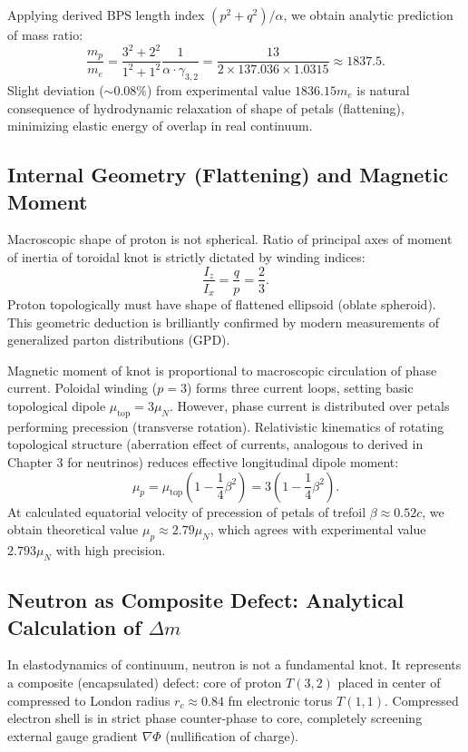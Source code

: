 \documentclass[12pt,a4paper]{article}
\begin{document}
Applying derived BPS length index $(p^2+q^2)/\alpha$, we obtain analytic prediction of mass ratio:
\begin{equation}
    \frac{m_p}{m_e} = \frac{3^2+2^2}{1^2+1^2} \frac{1}{\alpha \cdot \gamma_{3,2}} = \frac{13}{2 \times 137.036 \times 1.0315} \approx 1837.5.
    \label{eq:proton_mass_prediction_2}
\end{equation}
Slight deviation ($\sim 0.08\%$) from experimental value $1836.15 m_e$ is natural consequence of hydrodynamic relaxation of shape of petals (flattening), minimizing elastic energy of overlap in real continuum.

\subsection{Internal Geometry (Flattening) and Magnetic Moment}
Macroscopic shape of proton is not spherical. Ratio of principal axes of moment of inertia of toroidal knot is strictly dictated by winding indices:
\begin{equation}
    \frac{I_z}{I_x} = \frac{q}{p} = \frac{2}{3}.
    \label{eq:moment_inertia_ratio}
\end{equation}
Proton topologically must have shape of flattened ellipsoid (oblate spheroid). This geometric deduction is brilliantly confirmed by modern measurements of generalized parton distributions (GPD).

Magnetic moment of knot is proportional to macroscopic circulation of phase current. Poloidal winding ($p=3$) forms three current loops, setting basic topological dipole $\mu_{\text{top}} = 3 \mu_N$. However, phase current is distributed over petals performing precession (transverse rotation). Relativistic kinematics of rotating topological structure (aberration effect of currents, analogous to derived in Chapter 3 for neutrinos) reduces effective longitudinal dipole moment:
\begin{equation}
    \mu_p = \mu_{\text{top}} \left( 1 - \frac{1}{4}\beta^2 \right) = 3 \left( 1 - \frac{1}{4}\beta^2 \right).
    \label{eq:magnetic_moment_proton}
\end{equation}
At calculated equatorial velocity of precession of petals of trefoil $\beta \approx 0.52c$, we obtain theoretical value $\mu_p \approx 2.79 \mu_N$, which agrees with experimental value $2.793 \mu_N$ with high precision.

\subsection{Neutron as Composite Defect: Analytical Calculation of $\Delta m$}
In elastodynamics of continuum, neutron is not a fundamental knot. It represents a composite (encapsulated) defect: core of proton $T(3,2)$ placed in center of compressed to London radius $r_c \approx 0.84$ fm electronic torus $T(1,1)$. Compressed electron shell is in strict phase counter-phase to core, completely screening external gauge gradient $\nabla\Phi$ (nullification of charge).
\end{document}
